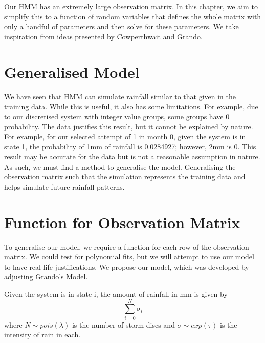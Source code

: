 
Our HMM has an extremely large observation matrix. In this chapter, we aim to simplify this to a function of random variables that defines the whole matrix with only a handful of parameters and then solve for these parameters. We take inspiration from ideas presented by Cowperthwait and Grando.

\section{Generalised Model}
\label{Generalising_the_Observation_Matrix:Generalised_Model}

We have seen that HMM can simulate rainfall similar to that given in the training data. While this is useful, it also has some limitations. For example, due to our discretised system with integer value groups, some groups have 0 probability. The data justifies this result, but it cannot be explained by nature. For example, for our selected attempt of 1 in month 0, given the system is in state 1, the probability of 1mm of rainfall is 0.0284927; however, 2mm is 0. This result may be accurate for the data but is not a reasonable assumption in nature. As such, we must find a method to generalise the model. Generalising the observation matrix such that the simulation represents the training data and helps simulate future rainfall patterns.


\section{Function for Observation Matrix}
\label{Generalising_the_Observation_Matrix:Function_For_Observation_Matrix}

To generalise our model, we require a function for each row of the observation matrix. We could test for polynomial fits, but we will attempt to use our model to have real-life justifications. We propose our model, which was developed by adjusting Grando's Model.

\begin{prop}
    \label{model}
    Given the system is in state i, the amount of rainfall in mm is given by
    \begin{equation}
        \sum_{i=0}^N \sigma_i
    \end{equation}
    where $N \sim pois(\lambda)$ is the number of storm discs and $\sigma \sim exp(\tau)$ is the intensity of rain in each.
\end{prop}



